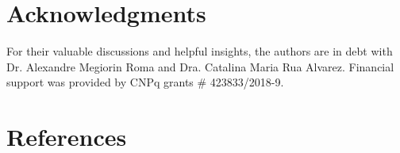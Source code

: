\documentclass[review]{elsarticle}
\begin{document}
\section*{Acknowledgments}
{\small
\noindent  For their valuable discussions and helpful insights, the authors are in debt with Dr. Alexandre Megiorin Roma and Dra. Catalina Maria Rua Alvarez. Financial support was provided by CNPq grants \# 423833/2018-9.} %

\section*{References}


\end{document}
